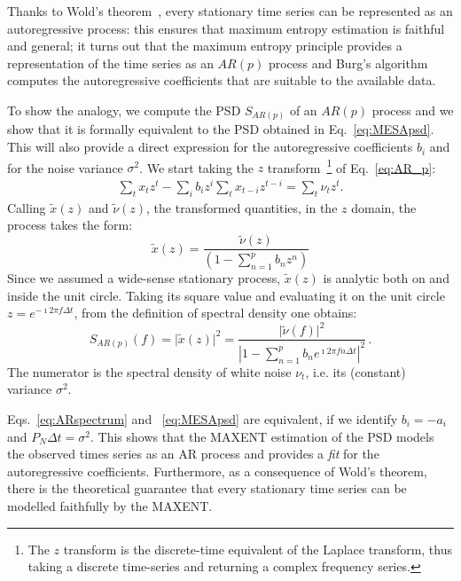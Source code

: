 \documentclass{aa}
\begin{document}
Thanks to Wold's theorem~\citep{Wold_theorem}, every stationary time series can be represented as an autoregressive process: this ensures that maximum entropy estimation is faithful and general; it turns out that the maximum entropy principle provides a representation of the time series as an $AR(p)$ process and Burg's algorithm computes the autoregressive coefficients that are suitable to the available data.

To show the analogy, we compute the PSD $S_{AR(p)}$ of an $AR(p)$ process and we show that it is formally equivalent to the PSD obtained in Eq.~\eqref{eq:MESApsd}. This will also provide a direct expression for the autoregressive coefficients $b_i$ and for the noise variance $\sigma^2$.
We start taking the $z$ transform~\footnote{The $z$ transform is the discrete-time equivalent of the Laplace transform, thus taking a discrete time-series and returning a complex frequency series.} of Eq.~\eqref{eq:AR_p}: 
\begin{align}
    \sum_t x_t z^t - \sum_i b_i z^i\sum_t x_{t - i} z^{t - i} = \sum_t \nu_t z^t.
\end{align}
Calling $\tilde x(z)$ and $\tilde \nu (z)$, the transformed quantities, 
in the $z$ domain, the process takes the form:
\begin{equation}
    \tilde x(z) = \frac{\tilde\nu(z)}{\left(1 - \sum_{n = 1}^p b_n z^n \right)}
\end{equation}
Since we assumed a wide-sense stationary process, $\tilde{x}(z)$ is analytic both on and inside the unit circle. Taking its square value and evaluating it on the unit circle $z = e^{-\imath 2 \pi f \Delta t}$, from the definition of spectral density one obtains:
\begin{equation}\label{eq:ARspectrum}
    S_{AR(p)}(f) = \vert \tilde x(z)\vert ^ 2 = 
    \frac{\vert \tilde \nu(f) \vert ^ 2}{\left\vert 1 - \sum_{n = 1}^p b_n e^{\imath 2 \pi f n \Delta t} \right\vert ^ 2}\,.
\end{equation}
The numerator is the spectral density of white noise $\nu_t$, i.e. its (constant) variance $\sigma^2$.

Eqs.~\eqref{eq:ARspectrum} and ~\eqref{eq:MESApsd} are equivalent, if we identify $b_i = - a_i$ and $P_N \Delta t= \sigma ^ 2$.
This shows that the MAXENT estimation of the PSD models the observed times series as an AR process and provides a {\it fit} for the autoregressive coefficients.
Furthermore, as a consequence of Wold's theorem, there is the theoretical guarantee that every stationary time series can be modelled faithfully by the MAXENT.
\end{document}

